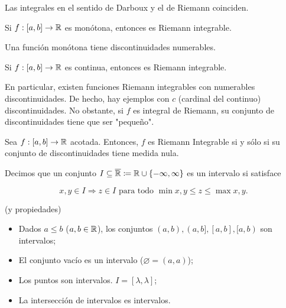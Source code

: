 
\begin{note}
	Las integrales en el sentido de Darboux y el de Riemann coinciden.
\end{note}

\begin{prop}
	Si $f:[a,b]\to\mathbb{R}$ es monótona, entonces es Riemann integrable.
\end{prop}

\begin{remark}
	Una función monótona tiene discontinuidades numerables.
\end{remark}

\begin{prop}
	Si $f:[a,b]\to\mathbb{R}$ es continua, entonces es Riemann integrable.
\end{prop}

En particular, existen funciones Riemann integrables con numerables discontinuidades. De hecho, hay ejemplos con $c$ (cardinal del continuo) discontinuidades. No obstante, si $f$ es integral de Riemann, su conjunto de discontinuidades tiene que ser "pequeño".

\begin{theorem}
	Sea $f:[a,b]\to\mathbb{R}$ acotada. Entonces, $f$ es Riemann Integrable si y sólo si su conjunto de discontinuidades tiene medida nula.
\end{theorem}

\begin{definition}[intervalo]
	Decimos que un conjunto $I\subseteq\overline{\mathbb{R}}\coloneq\mathbb{R}\cup \{-\infty,\infty\}$ es un intervalo si satisface

	\[
	x,y\in I \Rightarrow z\in I \text{ para todo } \min x,y\leq z\leq\max x,y.
	\]
\end{definition}

\begin{eg}
	(y propiedades)
	\begin{itemize}
		\item Dados $a\leq b$ ($a,b\in\mathbb{R}$), los conjuntos $(a,b),(a,b],[a,b],[a,b)$ son intervalos;

		\item El conjunto vacío es un intervalo ($\varnothing = (a,a)$);

		\item Los puntos son intervalos. $I = [\lambda,\lambda]$;

		\item La intersección de intervalos es intervalos.
	\end{itemize}
\end{eg}

